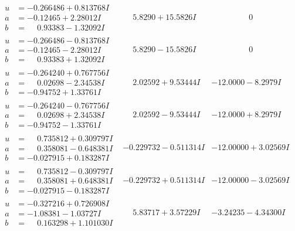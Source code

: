 \documentclass[1p]{elsarticle_modified}
\theoremstyle{definition}
\begin{document}
$$\begin{array}{c|c|c}
\begin{aligned}
u &= -0.266486 + 0.813768 I \\
a &= -0.12465 + 2.28012 I \\
b &= \phantom{-}0.93383 - 1.32092 I\end{aligned}
 & \phantom{-}5.8290 + 15.5826 I & \phantom{-0.000000 } 0 \\ \hline\begin{aligned}
u &= -0.266486 - 0.813768 I \\
a &= -0.12465 - 2.28012 I \\
b &= \phantom{-}0.93383 + 1.32092 I\end{aligned}
 & \phantom{-}5.8290 - 15.5826 I & \phantom{-0.000000 } 0 \\ \hline\begin{aligned}
u &= -0.264240 + 0.767756 I \\
a &= \phantom{-}0.02698 - 2.34538 I \\
b &= -0.94752 + 1.33761 I\end{aligned}
 & \phantom{-}2.02592 + 9.53444 I & -12.0000 - 8.2979 I \\ \hline\begin{aligned}
u &= -0.264240 - 0.767756 I \\
a &= \phantom{-}0.02698 + 2.34538 I \\
b &= -0.94752 - 1.33761 I\end{aligned}
 & \phantom{-}2.02592 - 9.53444 I & -12.0000 + 8.2979 I \\ \hline\begin{aligned}
u &= \phantom{-}0.735812 + 0.309797 I \\
a &= \phantom{-}0.358081 - 0.648381 I \\
b &= -0.027915 + 0.183287 I\end{aligned}
 & -0.229732 - 0.511314 I & -12.00000 + 3.02569 I \\ \hline\begin{aligned}
u &= \phantom{-}0.735812 - 0.309797 I \\
a &= \phantom{-}0.358081 + 0.648381 I \\
b &= -0.027915 - 0.183287 I\end{aligned}
 & -0.229732 + 0.511314 I & -12.00000 - 3.02569 I \\ \hline\begin{aligned}
u &= -0.327216 + 0.726908 I \\
a &= -1.08381 - 1.03727 I \\
b &= \phantom{-}0.163298 + 1.101030 I\end{aligned}
 & \phantom{-}5.83717 + 3.57229 I & -3.24235 - 4.34300 I \\ \hline\begin{aligned}

\end{aligned}
\end{array}$$
\end{document}
